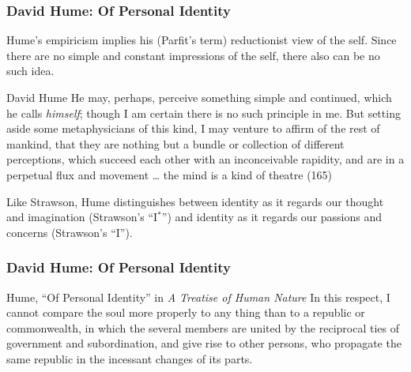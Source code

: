 \documentclass[xcolor=dvipsnames]{beamer}
\begin{document}

\begin{frame}
  \frametitle{David Hume: Of Personal Identity}
  Hume's empiricism implies his (Parfit's term) reductionist view
  of the self. Since there are no simple and constant impressions
  of the self, there also can be no such idea.
  \begin{block}{David Hume}
    He may, perhaps, perceive something simple and continued,
    which he calls \emph{himself}; though I am certain there is no
    such principle in me. But setting aside some metaphysicians of
    this kind, I may venture to affirm of the rest of mankind,
    that they are nothing but a bundle or collection of different
    perceptions, which succeed each other with an inconceivable
    rapidity, and are in a perpetual flux and movement {\ldots}
    the mind is a kind of theatre (165)
  \end{block}
Like Strawson, Hume distinguishes between identity as it regards
our thought and imagination (Strawson's ``I$^{\ast}$'') and identity
as it regards our passions and concerns (Strawson's ``I''). 
\end{frame}

\begin{frame}
  \frametitle{David Hume: Of Personal Identity}
  \begin{block}{Hume, ``Of Personal Identity'' in \emph{A Treatise of Human Nature}}
    In this respect, I cannot compare the soul more properly to any
    thing than to a republic or commonwealth, in which the several
    members are united by the reciprocal ties of government and
    subordination, and give rise to other persons, who propagate the
    same republic in the incessant changes of its parts.
  \end{block}
\end{frame}
\end{document}
